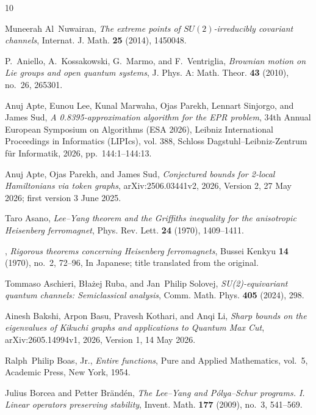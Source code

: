 \documentclass[reqno]{amsart}
\theoremstyle{definition}
\theoremstyle{remark}
\begin{document}
\begin{thebibliography}{10}

Muneerah Al~Nuwairan, \emph{The extreme points of {$SU(2)$}-irreducibly
  covariant channels}, Internat. J. Math. \textbf{25} (2014), 1450048.

P.~Aniello, A.~Kossakowski, G.~Marmo, and F.~Ventriglia, \emph{Brownian motion
  on {Lie} groups and open quantum systems}, J. Phys. A: Math. Theor.
  \textbf{43} (2010), no.~26, 265301.

Anuj Apte, Eunou Lee, Kunal Marwaha, Ojas Parekh, Lennart Sinjorgo, and James
  Sud, \emph{A 0.8395-approximation algorithm for the {EPR} problem}, 34th
  Annual European Symposium on Algorithms ({ESA} 2026), Leibniz International
  Proceedings in Informatics (LIPIcs), vol. 388, Schloss
  Dagstuhl--Leibniz-Zentrum f{\"u}r Informatik, 2026, pp.~144:1--144:13.

Anuj Apte, Ojas Parekh, and James Sud, \emph{Conjectured bounds for 2-local
  {Hamiltonians} via token graphs}, arXiv:2506.03441v2, 2026, Version 2, 27 May
  2026; first version 3 June 2025.

Taro Asano, \emph{{Lee--Yang} theorem and the {Griffiths} inequality for the
  anisotropic {Heisenberg} ferromagnet}, Phys. Rev. Lett. \textbf{24} (1970),
  1409--1411.

\bysame, \emph{Rigorous theorems concerning {Heisenberg} ferromagnets}, Bussei
  Kenkyu \textbf{14} (1970), no.~2, 72--96, In Japanese; title translated from
  the original.

Tommaso Aschieri, B{\l}a{\.{z}}ej Ruba, and Jan~Philip Solovej,
  \emph{{SU(2)}-equivariant quantum channels: Semiclassical analysis}, Comm.
  Math. Phys. \textbf{405} (2024), 298.

Ainesh Bakshi, Arpon Basu, Pravesh Kothari, and Anqi Li, \emph{Sharp bounds on
  the eigenvalues of {Kikuchi} graphs and applications to {Quantum Max Cut}},
  arXiv:2605.14994v1, 2026, Version 1, 14 May 2026.

Ralph~Philip Boas, Jr., \emph{Entire functions}, Pure and Applied Mathematics,
  vol.~5, Academic Press, New York, 1954.

Julius Borcea and Petter Br{\"a}nd{\'e}n, \emph{The {Lee--Yang} and
  {P{\'o}lya--Schur} programs. {I}. {Linear} operators preserving stability},
  Invent. Math. \textbf{177} (2009), no.~3, 541--569.


\end{thebibliography}
\end{document}
